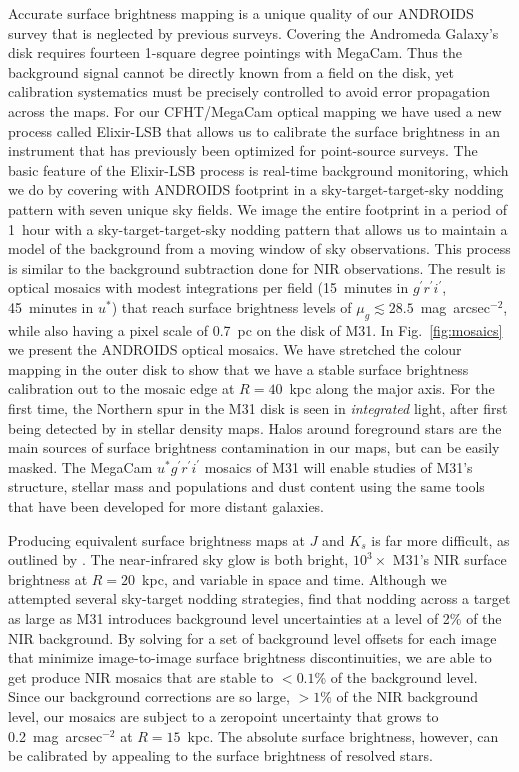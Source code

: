 \documentclass[11pt,twoside]{article}
\begin{document}
Accurate surface brightness mapping is a unique quality of our ANDROIDS survey that is neglected by previous surveys.
Covering the Andromeda Galaxy's disk requires fourteen 1-square degree pointings with MegaCam.
Thus the background signal cannot be directly known from a field on the disk, yet calibration systematics must be precisely controlled to avoid error propagation across the maps.
For our CFHT/MegaCam optical mapping we have used a new process called Elixir-LSB that allows us to calibrate the surface brightness in an instrument that has previously been optimized for point-source surveys.
The basic feature of the Elixir-LSB process is real-time background monitoring, which we do by covering with ANDROIDS footprint in a sky-target-target-sky nodding pattern with seven unique sky fields.
We image the entire footprint in a period of 1~hour with a sky-target-target-sky nodding pattern that allows us to maintain a model of the background from a moving window of sky observations.
This process is similar to the background subtraction done for NIR observations.
The result is optical mosaics with modest integrations per field (15~minutes in $g^\prime r^\prime i^\prime$, 45~minutes in $u^*$) that reach surface brightness levels of $\mu_g \lesssim 28.5$~mag~arcsec$^{-2}$, while also having a pixel scale of 0.7~pc on the disk of M31.
In Fig.~\ref{fig:mosaics} we present the ANDROIDS optical mosaics.
We have stretched the colour mapping in the outer disk to show that we have a stable surface brightness calibration out to the mosaic edge at $R=40$~kpc along the major axis.
For the first time, the Northern spur in the M31 disk is seen in \emph{integrated} light, after first being detected by \cite{Ferguson:2002} in stellar density maps.
Halos around foreground stars are the main sources of surface brightness contamination in our maps, but can be easily masked.
The MegaCam $u^*g^\prime r^\prime i^\prime$ mosaics of M31 will enable studies of M31's structure, stellar mass and populations and dust content using the same tools that have been developed for more distant galaxies.

Producing equivalent surface brightness maps at $J$ and $K_s$ is far more difficult, as outlined by \cite{Sick:2013}.
The near-infrared sky glow is both bright, $10^3\times$ M31's NIR surface brightness at $R=20$~kpc, and variable in space and time.
Although we attempted several sky-target nodding strategies, \cite{Sick:2013} find that nodding across a target as large as M31 introduces background level uncertainties at a level of 2\% of the NIR background.
By solving for a set of background level offsets for each image that minimize image-to-image surface brightness discontinuities, we are able to get produce NIR mosaics that are stable to $< 0.1$\% of the background level.
Since our background corrections are so large, $>1$\% of the NIR background level, our mosaics are subject to a zeropoint uncertainty that grows to 0.2~mag~arcsec$^{-2}$ at $R=15$~kpc.
The absolute surface brightness, however, can be calibrated by appealing to the surface brightness of resolved stars.
\end{document}
